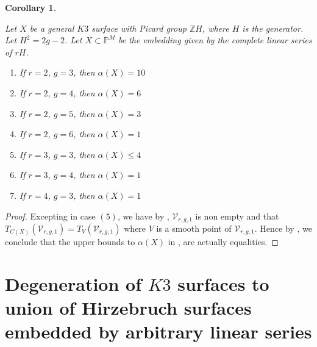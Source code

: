 \documentclass[11pt,twoside]{amsart}
\theoremstyle{plain}
\numberwithin{equation}{section}
\newtheorem{corollary}[theorem]{Corollary}
\theoremstyle{definition}
\begin{document}
\begin{corollary}\label{equality of alpha(x)}

Let $X$ be a general $K3$ surface with Picard group $\mathbb{Z}H$, where $H$ is the generator. Let $H^2 = 2g-2$. Let $X \subset \mathbb{P}^M$ be the embedding given by the complete linear series of $rH$. 
    \begin{enumerate}
        \item If $r = 2$, $g = 3$, then $\alpha(X) = 10$ %
        \item If $r = 2$, $g = 4$, then $\alpha(X) = 6$ 
        \item If $r = 2$, $g = 5$, then $\alpha(X) = 3$ 
        \item If $r = 2$, $g = 6$, then $\alpha(X) = 1$ 
        \item If $r = 3$, $g = 3$, then $\alpha(X) \leq 4$
        \item If $r = 3$, $g = 4$, then $\alpha(X) = 1$ 
        \item If $r = 4$, $g = 3$, then $\alpha(X) = 1$
\end{enumerate}
\end{corollary}

\begin{proof}
    Excepting in case $(5)$, we have by , $\mathcal{V}_{r,g,1}$ is non empty and that $T_{C(X)}(\mathcal{V}_{r,g,1}) = T_V(\mathcal{V}_{r,g,1})$ where $V$ is a smooth point of $\mathcal{V}_{r,g,1}$. Hence by , we conclude that the upper bounds to $\alpha(X)$ in , are actually equalities. 
\end{proof}

\section{Degeneration of $K3$ surfaces to union of Hirzebruch surfaces embedded by arbitrary linear series}
\end{document}
